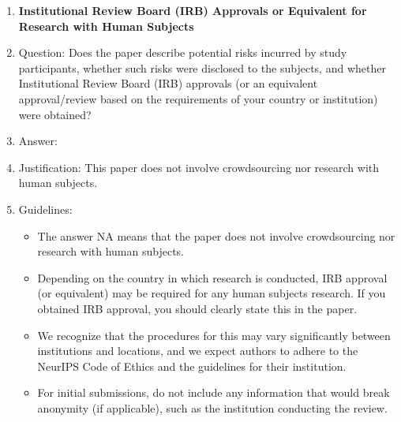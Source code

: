 \documentclass{article}
\begin{document}
\begin{enumerate}
\item {\bf Institutional Review Board (IRB) Approvals or Equivalent for Research with Human Subjects}
    \item[] Question: Does the paper describe potential risks incurred by study participants, whether such risks were disclosed to the subjects, and whether Institutional Review Board (IRB) approvals (or an equivalent approval/review based on the requirements of your country or institution) were obtained?
    \item[] Answer: \answerNA{} %
    \item[] Justification: This paper does not involve crowdsourcing nor research with human subjects.
    \item[] Guidelines:
    \begin{itemize}
        \item The answer NA means that the paper does not involve crowdsourcing nor research with human subjects.
        \item Depending on the country in which research is conducted, IRB approval (or equivalent) may be required for any human subjects research. If you obtained IRB approval, you should clearly state this in the paper. 
        \item We recognize that the procedures for this may vary significantly between institutions and locations, and we expect authors to adhere to the NeurIPS Code of Ethics and the guidelines for their institution. 
        \item For initial submissions, do not include any information that would break anonymity (if applicable), such as the institution conducting the review.
    \end{itemize}

\end{enumerate}
\end{document}
